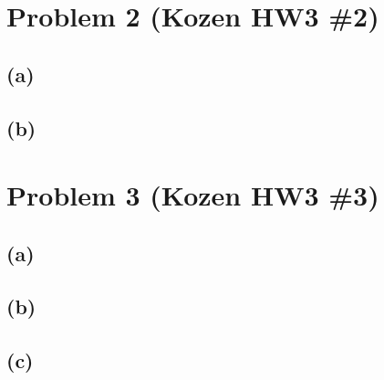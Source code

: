 \documentclass[11pt, a4paper, oneside]{article}
\begin{document}
\section*{Problem 2 (Kozen HW3 \#2)}
\subsection*{(a)}

\subsection*{(b)}

\section*{Problem 3 (Kozen HW3 \#3)}
\subsection*{(a)}

\subsection*{(b)}

\subsection*{(c)}
\end{document}
